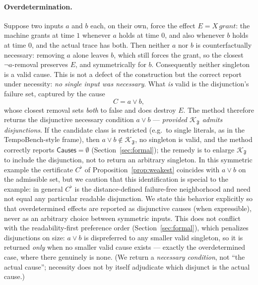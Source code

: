 \documentclass[11pt]{article}
\theoremstyle{remark}
\newcommand{\Frame}{\mathfrak{F}}
\begin{document}
\paragraph{Overdetermination.} Suppose two inputs \(a\) and \(b\) each, on their
own, force the effect \(E=X\,grant\): the machine grants at time \(1\) whenever
\(a\) holds at time \(0\), and also whenever \(b\) holds at time \(0\), and the
actual trace has both. Then neither \(a\) nor \(b\) is counterfactually
necessary: removing \(a\) alone leaves \(b\), which still forces the grant, so the
closest \(\neg a\)-removal preserves \(E\), and symmetrically for \(b\).
Consequently neither singleton is a valid cause. This is not a defect of the
construction but the correct report under necessity: \emph{no single input was
necessary}. What \emph{is} valid is the disjunction's failure set, captured by the
cause
\[
  C = a\lor b,
\]
whose closest removal sets \emph{both} to false and does destroy \(E\). The
method therefore returns the disjunctive necessary condition \(a\lor b\) ---
\emph{provided \(\mathcal{K}_{\Frame}\) admits disjunctions}. If the candidate
class is restricted (e.g.\ to single literals, as in the TempoBench-style frame),
then \(a\lor b\notin\mathcal{K}_{\Frame}\), no singleton is valid, and the method
correctly reports \(\mathsf{Causes}=\emptyset\) (Section~\ref{sec:formal}); the
remedy is to enlarge \(\mathcal{K}_{\Frame}\) to include the disjunction, not to
return an arbitrary singleton. In this symmetric example the certificate
\(C^{\flat}\) of Proposition~\ref{prop:weakest} coincides with \(a\lor b\) on the
admissible set, but we caution that this identification is special to the example:
in general \(C^{\flat}\) is the distance-defined failure-free neighborhood and
need not equal any particular readable disjunction. We state this behavior
explicitly so that overdetermined effects are reported as disjunctive causes (when
expressible), never as an arbitrary choice between symmetric inputs. This does not
conflict with the readability-first preference order
(Section~\ref{sec:formal}), which penalizes disjunctions on size: \(a\lor b\) is
dispreferred to any smaller valid singleton, so it is returned \emph{only} when no
smaller valid cause exists --- exactly the overdetermined case, where there
genuinely is none. (We return a \emph{necessary condition}, not ``the actual
cause''; necessity does not by itself adjudicate which disjunct is the actual
cause.)
\end{document}
